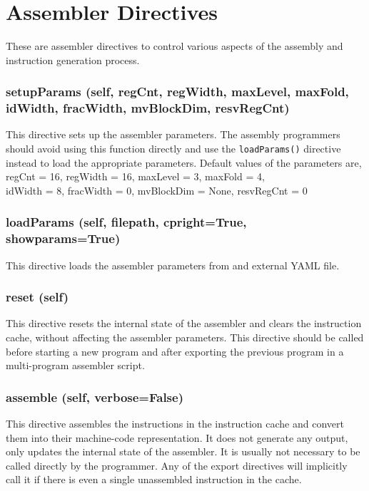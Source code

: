 \documentclass{article}
\begin{document}
\section{Assembler Directives}
These are assembler directives to control various aspects of the assembly and
instruction generation process.



\subsubsection*{setupParams (self, regCnt, regWidth, maxLevel, maxFold, idWidth, fracWidth, mvBlockDim, resvRegCnt)}
This directive sets up the assembler parameters.
The assembly programmers should avoid using this function directly and use the \texttt{loadParams()}
directive instead to load the appropriate parameters.
Default values of the parameters are, \\
\hspace*{1cm} regCnt = 16, regWidth = 16, maxLevel = 3, maxFold = 4, \\
\hspace*{1cm} idWidth = 8, fracWidth = 0, mvBlockDim = None, resvRegCnt = 0


\subsubsection*{loadParams (self, filepath, cpright=True, showparams=True)}
This directive loads the assembler parameters from and external YAML file.


\subsubsection*{reset (self)}
This directive resets the internal state of the assembler and clears the
instruction cache, without affecting the assembler parameters.
This directive should be called before starting a new program and after exporting 
the previous program in a multi-program assembler script.


\subsubsection*{assemble (self, verbose=False)}
This directive assembles the instructions in the instruction cache and convert
them into their machine-code representation.
It does not generate any output, only updates the internal state of the
assembler.
It is usually not necessary to be called directly by the programmer.
Any of the export directives will implicitly call it if there is even a single
unassembled instruction in the cache.
\end{document}
